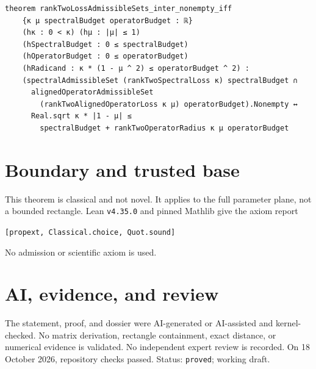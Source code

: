 \documentclass[11pt]{article}
\begin{document}
\begin{lstlisting}
theorem rankTwoLossAdmissibleSets_inter_nonempty_iff
    {κ μ spectralBudget operatorBudget : ℝ}
    (hκ : 0 < κ) (hμ : |μ| ≤ 1)
    (hSpectralBudget : 0 ≤ spectralBudget)
    (hOperatorBudget : 0 ≤ operatorBudget)
    (hRadicand : κ * (1 - μ ^ 2) ≤ operatorBudget ^ 2) :
    (spectralAdmissibleSet (rankTwoSpectralLoss κ) spectralBudget ∩
      alignedOperatorAdmissibleSet
        (rankTwoAlignedOperatorLoss κ μ) operatorBudget).Nonempty ↔
      Real.sqrt κ * |1 - μ| ≤
        spectralBudget + rankTwoOperatorRadius κ μ operatorBudget
\end{lstlisting}

\section{Boundary and trusted base}
This theorem is classical and not novel. It applies to the full parameter plane, not a
bounded rectangle. Lean \texttt{v4.35.0} and pinned Mathlib give the axiom report
\begin{center}\texttt{[propext, Classical.choice, Quot.sound]}\end{center}
No admission or scientific axiom is used.

\section{AI, evidence, and review}
The statement, proof, and dossier were AI-generated or AI-assisted and kernel-checked.
No matrix derivation, rectangle containment, exact distance, or numerical evidence is
validated. No independent expert review is recorded. On 18 October 2026, repository
checks passed. Status: \texttt{proved}; working draft.
\end{document}
